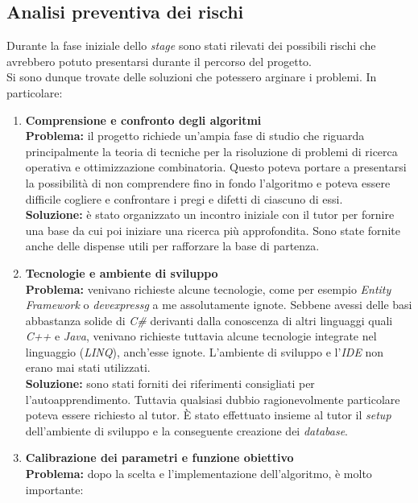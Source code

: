 \subsection{Analisi preventiva dei rischi}
Durante la fase iniziale dello \textit{stage} sono stati rilevati dei possibili rischi che avrebbero potuto presentarsi
durante il percorso del progetto.\\
Si sono dunque trovate delle soluzioni che potessero arginare i problemi. In particolare:
\begin{enumerate}
    \item \textbf{Comprensione e confronto degli algoritmi}\\[0.2cm]
    \textbf{Problema:} il progetto richiede un'ampia fase di studio che riguarda principalmente la teoria
    di tecniche per la risoluzione di problemi di ricerca operativa e ottimizzazione combinatoria.
    Questo poteva portare a presentarsi la possibilità di non comprendere fino in fondo l'algoritmo e poteva essere difficile cogliere e confrontare
    i pregi e difetti di ciascuno di essi.\\[0.2cm]
    \textbf{Soluzione:} è stato organizzato un incontro iniziale con il tutor per fornire una base da cui poi iniziare una ricerca più approfondita.
    Sono state fornite anche delle dispense utili per rafforzare la base di partenza.
    \item \textbf{Tecnologie e ambiente di sviluppo}\\[0.2cm]
    \textbf{Problema:} venivano richieste alcune tecnologie, come per esempio \textit{Entity Framework} o \textit{\gls{devexpressg}} a me assolutamente ignote.
    Sebbene avessi delle basi abbastanza solide di \textit{C\#} derivanti dalla conoscenza di altri linguaggi quali \textit{C++} e \textit{Java}, venivano richieste tuttavia
    alcune tecnologie integrate nel linguaggio (\textit{LINQ}), anch'esse ignote. L'ambiente di sviluppo e l'\textit{IDE} non erano mai stati utilizzati.\\[0.2cm]
    \textbf{Soluzione:} sono stati forniti dei riferimenti consigliati per l'autoapprendimento. Tuttavia qualsiasi dubbio ragionevolmente particolare
    poteva essere richiesto al tutor. È stato effettuato insieme al tutor il \textit{setup} dell'ambiente di sviluppo e la conseguente creazione dei \textit{database}.
    \item \textbf{Calibrazione dei parametri e funzione obiettivo}\\[0.2cm]
    \textbf{Problema:} dopo la scelta e l'implementazione dell'algoritmo, è molto importante:

\end{enumerate}
